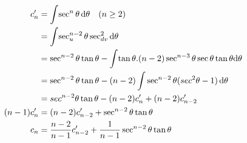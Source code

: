 \documentclass[11pt]{amsbook}
\begin{document}
\begin{align*}
	c'_{n} &= \int \! \sec^{n} \theta \, \mathrm{d} \theta \quad (n \ge 2) \\
	&= \int \! \sec^{n-2}_{u} \theta \sec^{2}_{dv} \mathrm{d} \theta \\
	&= \sec^{n-2} \theta \tan \theta - \int \! \tan \theta . (n-2) \sec^{n-3} \theta \sec \theta \tan \theta \mathrm{d} \theta \\
	&= \sec^{n-2} \theta \tan \theta - (n-2) \int \sec^{n-2} \theta (sec^{2} \theta -1) \, \mathrm{d} \theta \\
	&= sec^{n-2} \theta \tan \theta - (n-2) c'_{n} + (n-2)c'_{n-2} \\
	(n-1)c'_{n} &= (n-2)c'_{n-2} + \sec^{n-2} \theta \tan \theta \\
	c_{n} &= \frac{n-2}{n-1} c'_{n-2} + \frac{1}{n-1} \sec^{n-2} \theta \tan \theta
\end{align*}






















\end{document}

